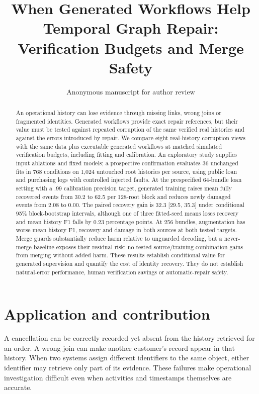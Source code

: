 \documentclass[11pt]{article}
\title{When Generated Workflows Help Temporal Graph Repair: Verification Budgets and Merge Safety}
\author{Anonymous manuscript for author review}
\date{}
\begin{document}
\maketitle

\begin{abstract}
An operational history can lose evidence through missing links, wrong joins or fragmented identities. Generated workflows provide exact repair references, but their value must be tested against repeated corruption of the same verified real histories and against the errors introduced by repair. We compare eight real-history corruption views with the same data plus executable generated workflows at matched simulated verification budgets, including fitting and calibration. An exploratory study supplies input ablations and fixed models; a prospective confirmation evaluates 36 unchanged fits in 768 conditions on 1,024 untouched root histories per source, using public loan and purchasing logs with controlled injected faults. At the prespecified 64-bundle loan setting with a .99 calibration precision target, generated training raises mean fully recovered events from 30.2 to 62.5 per 128-root block and reduces newly damaged events from 2.08 to 0.00. The paired recovery gain is 32.3 [29.5, 35.3] under conditional 95\% block-bootstrap intervals, although one of three fitted-seed means loses recovery and mean history F1 falls by 0.23 percentage points. At 256 bundles, augmentation has worse mean history F1, recovery and damage in both sources at both tested targets. Merge guards substantially reduce harm relative to unguarded decoding, but a never-merge baseline exposes their residual risk: no tested source/training combination gains from merging without added harm. These results establish conditional value for generated supervision and quantify the cost of identity recovery. They do not establish natural-error performance, human verification savings or automatic-repair safety.
\end{abstract}

\section{Application and contribution}
A cancellation can be correctly recorded yet absent from the history retrieved for an order. A wrong join can make another customer's record appear in that history. When two systems assign different identifiers to the same object, either identifier may retrieve only part of its evidence. These failures make operational investigation difficult even when activities and timestamps themselves are accurate.
\end{document}
